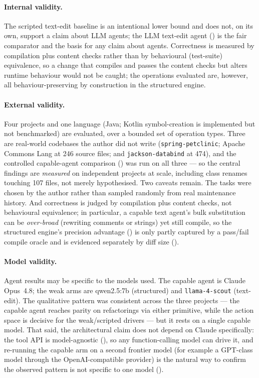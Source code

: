 \paragraph{Internal validity.} The scripted text-edit baseline is an intentional
lower bound and does not, on its own, support a claim about LLM agents; the LLM
text-edit agent () is the fair comparator and the basis
for any claim about agents. Correctness is measured by compilation plus content
checks rather than by behavioural (test-suite) equivalence, so a change that
compiles and passes the content checks but alters runtime behaviour would not be
caught; the operations evaluated are, however, all behaviour-preserving by
construction in the structured engine.

\paragraph{External validity.} Four projects and one language (Java; Kotlin
symbol-creation is implemented but not benchmarked) are evaluated, over a bounded set
of operation types. Three are real-world codebases the author did not write
(\texttt{spring-petclinic}; Apache Commons Lang at 246 source files; and
\texttt{jackson-databind} at 474), and the controlled capable-agent comparison
() was run on all three --- so the central findings are
\emph{measured} on independent projects at scale, including class renames touching
107 files, not merely hypothesised. Two caveats remain. The tasks were chosen by the
author rather than sampled randomly from real maintenance history. And correctness is
judged by compilation plus content checks, not behavioural equivalence; in particular,
a capable text agent's bulk substitution can be \emph{over-broad} (rewriting comments
or strings) yet still compile, so the structured engine's precision advantage
() is only partly captured by a pass/fail compile oracle and
is evidenced separately by diff size ().

\paragraph{Model validity.} Agent results may be specific to the models used. The
capable agent is Claude Opus~4.8; the weak arms are qwen2.5:7b (structured) and
\texttt{llama-4-scout} (text-edit). The qualitative pattern was consistent across the
three projects --- the capable agent reaches parity on refactorings via either
primitive, while the action space is decisive for the weak/scripted drivers --- but it
rests on a single capable model.
That said, the architectural claim does not depend on Claude specifically: the tool API
is model-agnostic (), so any function-calling model can drive it,
and re-running the capable arm on a second frontier model (for example a GPT-class model
through the OpenAI-compatible provider) is the natural way to confirm the observed
pattern is not specific to one model ().

